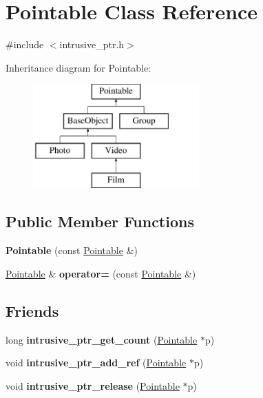 \hypertarget{classPointable}{\section{Pointable Class Reference}
\label{classPointable}
}


{\ttfamily \#include $<$intrusive\-\_\-ptr.\-h$>$}

Inheritance diagram for Pointable\-:\begin{figure}[H]
\begin{center}
\leavevmode
\includegraphics[height=4.000000cm]{classPointable}
\end{center}
\end{figure}
\subsection*{Public Member Functions}
\begin{DoxyCompactItemize}
\item 
\hypertarget{classPointable_adc4da364054bdd4c4a9624f5dc190c8a}{{\bfseries Pointable} (const \hyperlink{classPointable}{Pointable} \&)}\label{classPointable_adc4da364054bdd4c4a9624f5dc190c8a}

\item 
\hypertarget{classPointable_a8a7eb6956905e6e320ce97fa24f03b59}{\hyperlink{classPointable}{Pointable} \& {\bfseries operator=} (const \hyperlink{classPointable}{Pointable} \&)}\label{classPointable_a8a7eb6956905e6e320ce97fa24f03b59}

\end{DoxyCompactItemize}
\subsection*{Friends}
\begin{DoxyCompactItemize}
\item 
\hypertarget{classPointable_a9c08ce04af1d8cd2697b64990c51a5f4}{long {\bfseries intrusive\-\_\-ptr\-\_\-get\-\_\-count} (\hyperlink{classPointable}{Pointable} $\ast$p)}\label{classPointable_a9c08ce04af1d8cd2697b64990c51a5f4}

\item 
\hypertarget{classPointable_a16ec5f964af06a93d6c7cfe0979ff672}{void {\bfseries intrusive\-\_\-ptr\-\_\-add\-\_\-ref} (\hyperlink{classPointable}{Pointable} $\ast$p)}\label{classPointable_a16ec5f964af06a93d6c7cfe0979ff672}

\item 
\hypertarget{classPointable_aee25e5a73726af47eb078e2087eaee57}{void {\bfseries intrusive\-\_\-ptr\-\_\-release} (\hyperlink{classPointable}{Pointable} $\ast$p)}\label{classPointable_aee25e5a73726af47eb078e2087eaee57}

\end{DoxyCompactItemize}


